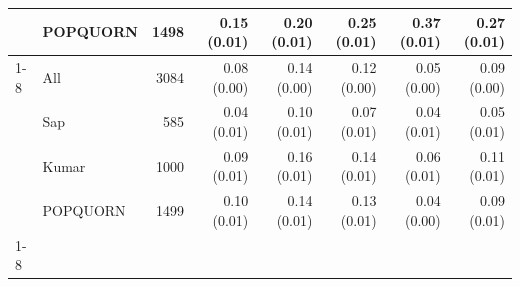 \begin{table}[t]
\begin{tabular}{llrrrrrr}
 & POPQUORN & 1498 & 0.15 (0.01) & 0.20 (0.01) & 0.25 (0.01) & 0.37 (0.01) & 0.27 (0.01) \\
\cline{1-8}
\multirow[t]{4}{*}{Gemma 31B} & All & 3084 & 0.08 (0.00) & 0.14 (0.00) & 0.12 (0.00) & 0.05 (0.00) & 0.09 (0.00) \\
 & Sap & 585 & 0.04 (0.01) & 0.10 (0.01) & 0.07 (0.01) & 0.04 (0.01) & 0.05 (0.01) \\
 & Kumar & 1000 & 0.09 (0.01) & 0.16 (0.01) & 0.14 (0.01) & 0.06 (0.01) & 0.11 (0.01) \\
 & POPQUORN & 1499 & 0.10 (0.01) & 0.14 (0.01) & 0.13 (0.01) & 0.04 (0.00) & 0.09 (0.01) \\
\cline{1-8}
\bottomrule
\end{tabular}
\end{table}
